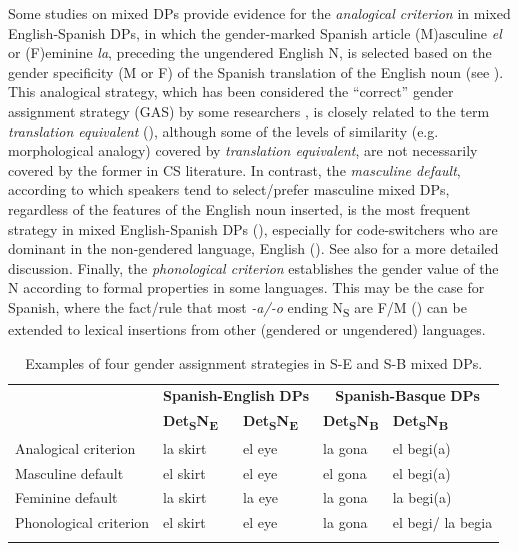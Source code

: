 \documentclass[output=paper]{langscibook}
\begin{document}
Some studies on mixed DPs provide evidence for the {\textit{analogical criterion}} {in mixed English-Spanish DPs, in which the gender-marked Spanish article (M)asculine} {\textit{el} }{or (F)eminine} {\textit{la}}{, preceding the ungendered English N, is selected based on the gender specificity (M or F) of the Spanish translation of the English noun (see ). This analogical strategy, which has been considered the “correct” gender assignment strategy (GAS) by some researchers} {\citep{JorschickEtAl2011}}{, is closely related to the term} {\textit{translation equivalent}} {(\citealt{BellamyParafitaCouto2022})}{, although some of the levels of similarity (e.g. morphological analogy) covered by} {\textit{translation equivalent}}{, are not necessarily covered by the former in CS literature. In contrast, the} {\textit{masculine default}}{, according to which speakers tend to select/prefer masculine mixed DPs, regardless of the features of the English noun inserted, is the most frequent strategy in mixed English-Spanish DPs} {(\citealt{OthegyLapidus2003})}{, especially for code-switchers who are dominant in the non-gendered language, English} {(\citealt{Beatty-MartínezDussias2019,LicerasEtAl2008,ValdésKroff2016})}{. See also \citet{BellamyParafitaCouto2022}} {for a more detailed discussion. Finally, the} {\textit{phonological criterion}} {establishes the gender value of the N according to formal properties in some languages. This may be the case for Spanish, where the fact/rule that most} {\textit{-a/-o}} {ending N}{\textsubscript{S}} {are F/M} {(\citealt{TeschnerRussell1984})} {can be extended to lexical insertions from other (gendered or ungendered) languages.}

\begin{table}
\begin{tabularx}{\textwidth}{lXXXl}
\lsptoprule
 & \multicolumn{2}{c}{{ \textbf{Spanish-English} \textbf{DPs}}} & \multicolumn{2}{c}{{ \textbf{Spanish-Basque} \textbf{DPs}}}\\
& { \textbf{Det\textsubscript{S}}\textbf{N\textsubscript{E}}} & { \textbf{Det\textsubscript{S}}\textbf{N\textsubscript{E}}} & { \textbf{Det\textsubscript{S}}\textbf{N\textsubscript{B}}} & { \textbf{Det\textsubscript{S}}\textbf{N\textsubscript{B}}}\\
\midrule
{ Analogical criterion} & { la skirt} & { el eye} & { la gona} & { el begi(a)}\\
{ Masculine default} & { el skirt} & { el eye} & { el gona} & { el begi(a)}\\
{ Feminine default} & { la skirt} & { la eye} & { la gona} & { la begi(a)}\\
{ Phonological criterion} & { el skirt} & { el eye} & { la gona} & { el begi/ la begia}\\
\lspbottomrule
\end{tabularx}
\caption{Examples of four gender assignment strategies in S-E and S-B mixed DPs.}
\label{tab:ezeiza:1}
\end{table}
\end{document}
